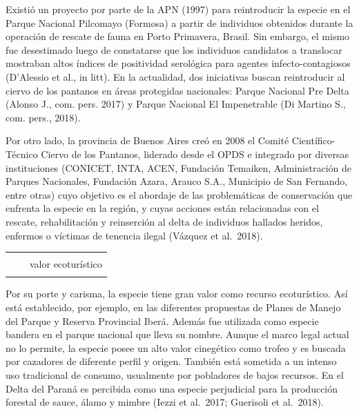 \documentclass[
  x11names]{article}
\begin{document}
Existió un proyecto por parte de la APN (1997) para reintroducir la
especie en el Parque Nacional Pilcomayo (Formosa) a partir de individuos
obtenidos durante la operación de rescate de fauna en Porto Primavera,
Brasil. Sin embargo, el mismo fue desestimado luego de constatarse que
los individuos candidatos a translocar mostraban altos índices de
positividad serológica para agentes infecto-contagiosos (D'Alessio et
al., in litt). En la actualidad, dos iniciativas buscan reintroducir al
ciervo de los pantanos en áreas protegidas nacionales: Parque Nacional
Pre Delta (Alonso J., com. pers. 2017) y Parque Nacional El Impenetrable
(Di Martino S., com. pers., 2018).

Por otro lado, la provincia de Buenos Aires creó en 2008 el Comité
Científico-Técnico Ciervo de los Pantanos, liderado desde el OPDS e
integrado por diversas instituciones (CONICET, INTA, ACEN, Fundación
Temaiken, Administración de Parques Nacionales, Fundación Azara, Arauco
S.A., Municipio de San Fernando, entre otras) cuyo objetivo es el
abordaje de las problemáticas de conservación que enfrenta la especie en
la región, y cuyas acciones están relacionadas con el~ rescate,
rehabilitación y reinserción al delta de individuos hallados heridos,
enfermos o víctimas de tenencia ilegal (Vázquez et al.~2018).

\begin{tabu} to 
\toprule
\textbf{} &  & \\
\textbf{} &  & valor ecoturístico\\
\textbf{} &  & \\
\bottomrule
\end{tabu}

Por su porte y carisma, la especie tiene gran valor como recurso
ecoturístico. Así está establecido, por ejemplo, en las diferentes
propuestas de Planes de Manejo del Parque y Reserva Provincial Iberá.
Además fue utilizada como especie bandera en el parque nacional que
lleva su nombre. Aunque el marco legal actual no lo permite, la especie
posee un alto valor cinegético como trofeo y es buscada por cazadores de
diferente perfil y origen. También está sometida a un intenso uso
tradicional de consumo, usualmente por pobladores de bajos recursos. En
el Delta del Paraná es percibida como una especie perjudicial para la
producción forestal de sauce, álamo y mimbre (Iezzi et al.~2017;
Guerisoli et al.~2018).
\end{document}
